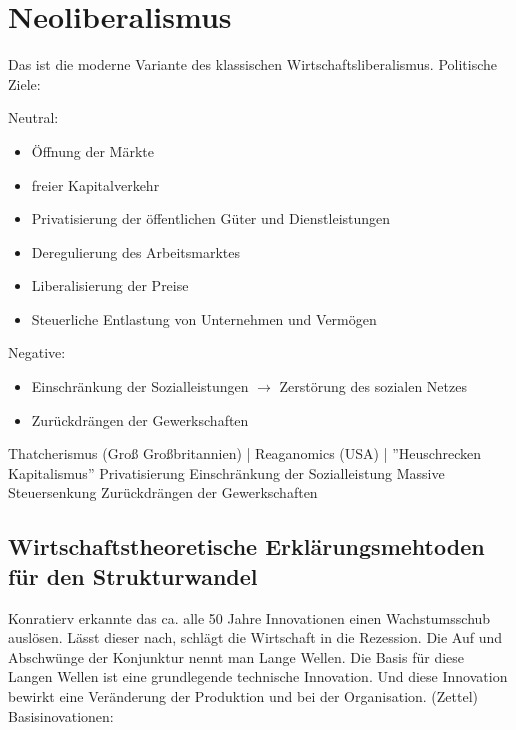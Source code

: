 \documentclass[a4paper]{report}
\begin{document}
\chapter{Neoliberalismus}
Das ist die moderne Variante des klassischen Wirtschaftsliberalismus.
\newline
Politische Ziele:

Neutral:

\begin{itemize}
\item Öffnung der Märkte 
\item freier Kapitalverkehr
\item Privatisierung der öffentlichen Güter und Dienstleistungen
\item Deregulierung des Arbeitsmarktes
\item Liberalisierung der Preise
\item Steuerliche Entlastung von Unternehmen und Vermögen
\end{itemize}

Negative:

\begin{itemize}
\item Einschränkung der Sozialleistungen $\rightarrow$ Zerstörung des sozialen Netzes
\item Zurückdrängen der Gewerkschaften
\end{itemize}

Thatcherismus (Groß Großbritannien) | Reaganomics (USA) | ''Heuschrecken Kapitalismus''
\newline
\newline
Privatisierung
Einschränkung der Sozialleistung
Massive Steuersenkung
Zurückdrängen der Gewerkschaften

\section{Wirtschaftstheoretische Erklärungsmehtoden für den Strukturwandel}

Konratierv erkannte das ca. alle 50 Jahre Innovationen einen Wachstumsschub auslösen. Lässt dieser nach, schlägt die Wirtschaft in die Rezession. Die Auf und Abschwünge der Konjunktur nennt man Lange Wellen. Die Basis für diese Langen Wellen ist eine grundlegende technische Innovation. Und diese Innovation bewirkt eine Veränderung der Produktion und bei der Organisation.
\newline
\newline
(Zettel)
\newline
\newline
Basisinovationen:
\end{document}
